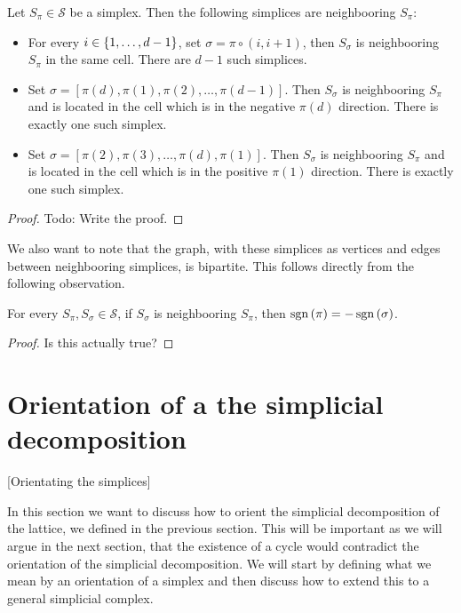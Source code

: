\begin{lemma}
    Let $S_{\pi} \in \mathcal{S}$ be a simplex. Then the following simplices are neighbooring $S_{\pi}$:
    \begin{itemize}
        \item For every $i \in \left\{1, \dots, d-1\right\}$, set $\sigma = \pi \circ (i, i+1)$, then $S_{\sigma}$ is neighbooring $S_{\pi}$ in the same cell. There are $d-1$ such simplices.
        \item Set $\sigma = [\pi(d), \pi(1), \pi(2), \dots, \pi(d-1)]$. Then $S_{\sigma}$ is neighbooring $S_{\pi}$ and is located in the cell which is in the negative $\pi(d)$ direction. There is exactly one such simplex.
        \item Set $\sigma = [\pi(2), \pi(3), \dots, \pi(d), \pi(1)]$. Then $S_{\sigma}$ is neighbooring $S_{\pi}$ and is located in the cell which is in the positive $\pi(1)$ direction. There is exactly one such simplex.
    \end{itemize}
\end{lemma}
\begin{proof}
    Todo: Write the proof.
\end{proof}

We also want to note that the graph, with these simplices as vertices and edges between neighbooring simplices, is bipartite. This follows directly from the following observation.
\begin{remark}
    For every $S_{\pi}, S_{\sigma} \in \mathcal{S}$, if $S_{\sigma}$ is neighbooring $S_{\pi}$, then $\operatorname{sgn}\left(\pi\right) = - \operatorname{sgn}\left(\sigma\right)$.
\end{remark}
\begin{proof}
    Is this actually true?
\end{proof}

\section{Orientation of a the simplicial decomposition}[Orientating the simplices]

In this section we want to discuss how to orient the simplicial decomposition of the lattice, we defined in the previous section. This will be important as we will argue in the next section, that the existence of a cycle would contradict the orientation of the simplicial decomposition. We will start by defining what we mean by an orientation of a simplex and then discuss how to extend this to a general simplicial complex.

